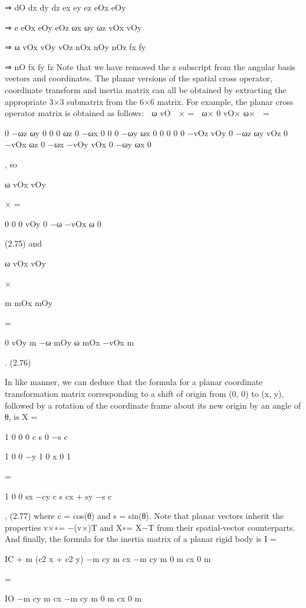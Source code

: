 ⇒ dO dx dy dz ex ey ez eOx eOy

⇒ e eOx eOy eOz ωx ωy ωz vOx vOy

⇒ ω vOx vOy vOz nOx nOy nOz fx fy

⇒ nO fx fy fz Note that we have removed the z subscript from the angular basis vectors and coordinates. The planar versions of the spatial cross operator, coordinate transform and inertia matrix can all be obtained by extracting the appropriate 3×3 submatrix from the 6×6 matrix. For example, the planar cross operator matrix is obtained as follows:  ω vO  × =  ω× 0 vO× ω×  =

0 −ωz ωy 0 0 0 ωz 0 −ωx 0 0 0 −ωy ωx 0 0 0 0 0 −vOz vOy 0 −ωz ωy vOz 0 −vOx ωz 0 −ωx −vOy vOx 0 −ωy ωx 0

, so

ω vOx vOy

× =

0 0 0 vOy 0 −ω −vOx ω 0

(2.75) and

ω vOx vOy

×

m mOx mOy

=

0 vOy m −ω mOy ω mOx −vOx m

. (2.76)

In like manner, we can deduce that the formula for a planar coordinate transformation matrix corresponding to a shift of origin from (0, 0) to (x, y), followed by a rotation of the coordinate frame about its new origin by an angle of θ, is X =

1 0 0 0 c s 0 −s c

1 0 0 −y 1 0 x 0 1

=

1 0 0 sx −cy c s cx + sy −s c

, (2.77) where c = cos(θ) and s = sin(θ). Note that planar vectors inherit the properties v×∗= −(v×)T and X∗= X−T from their spatial-vector counterparts. And finally, the formula for the inertia matrix of a planar rigid body is I =

IC + m (c2 x + c2 y) −m cy m cx −m cy m 0 m cx 0 m

=

IO −m cy m cx −m cy m 0 m cx 0 m

